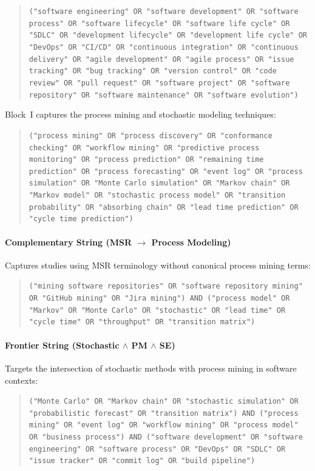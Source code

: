 \begin{quote}
\small\raggedright
\texttt{("software engineering" OR "software development" OR "software process"
OR "software lifecycle" OR "software life cycle" OR "SDLC" OR "development
lifecycle" OR "development life cycle" OR "DevOps" OR "CI/CD" OR "continuous
integration" OR "continuous delivery" OR "agile development" OR "agile process"
OR "issue tracking" OR "bug tracking" OR "version control" OR "code review" OR
"pull request" OR "software project" OR "software repository" OR "software
maintenance" OR "software evolution")}
\end{quote}

Block~I captures the process mining and stochastic modeling techniques:

\begin{quote}
\small\raggedright
\texttt{("process mining" OR "process discovery" OR "conformance checking" OR
"workflow mining" OR "predictive process monitoring" OR "process prediction" OR
"remaining time prediction" OR "process forecasting" OR "event log" OR "process
simulation" OR "Monte Carlo simulation" OR "Markov chain" OR "Markov model" OR
"stochastic process model" OR "transition probability" OR "absorbing chain" OR
"lead time prediction" OR "cycle time prediction")}
\end{quote}

\paragraph{Complementary String (MSR $\rightarrow$ Process Modeling)}
Captures studies using MSR terminology without canonical process mining terms:

\begin{quote}
\small\raggedright
\texttt{("mining software repositories" OR "software repository mining" OR
"GitHub mining" OR "Jira mining") AND ("process model" OR "Markov" OR "Monte
Carlo" OR "stochastic" OR "lead time" OR "cycle time" OR "throughput" OR
"transition matrix")}
\end{quote}

\paragraph{Frontier String (Stochastic $\wedge$ PM $\wedge$ SE)}
Targets the intersection of stochastic methods with process mining in software
contexts:

\begin{quote}
\small\raggedright
\texttt{("Monte Carlo" OR "Markov chain" OR "stochastic simulation" OR
"probabilistic forecast" OR "transition matrix") AND ("process mining" OR
"event log" OR "workflow mining" OR "process model" OR "business process") AND
("software development" OR "software engineering" OR "software process" OR
"DevOps" OR "SDLC" OR "issue tracker" OR "commit log" OR "build pipeline")}
\end{quote}

